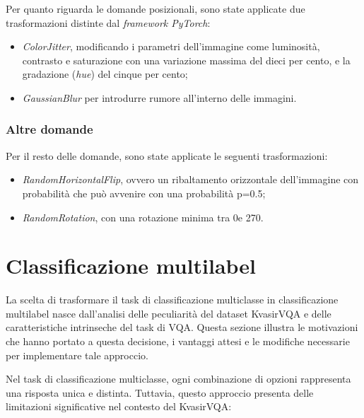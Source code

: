 \documentclass[../main.tex]{subfiles}
\begin{document}
Per quanto riguarda le domande posizionali, sono state applicate due trasformazioni distinte dal \textit{framework PyTorch}:

\begin{itemize}
    \item \textit{ColorJitter}, modificando i parametri dell'immagine come luminosità, contrasto e saturazione con una variazione massima del dieci per cento, e la gradazione (\textit{hue}) del cinque per cento;
    \item \textit{GaussianBlur} per introdurre rumore all'interno delle immagini.
\end{itemize}

\subsubsection{Altre domande}

Per il resto delle domande, sono state applicate le seguenti trasformazioni:

\begin{itemize}
    \item \textit{RandomHorizontalFlip}, ovvero un ribaltamento orizzontale dell'immagine con probabilità che può avvenire con una probabilità p=0.5;
    \item \textit{RandomRotation}, con una rotazione minima tra 0\degree e 270\degree.
\end{itemize}

\section{Classificazione multilabel}

La scelta di trasformare il task di classificazione multiclasse in classificazione multilabel nasce dall'analisi delle peculiarità del dataset KvasirVQA e delle caratteristiche intrinseche del task di VQA. 
Questa sezione illustra le motivazioni che hanno portato a questa decisione, i vantaggi attesi e le modifiche necessarie per implementare tale approccio.

Nel task di classificazione multiclasse, ogni combinazione di opzioni rappresenta una risposta unica e distinta. Tuttavia, questo approccio presenta delle limitazioni significative nel contesto del KvasirVQA:
\end{document}
